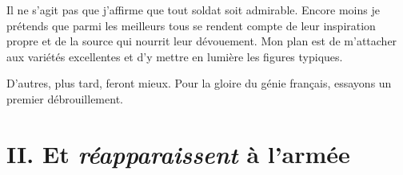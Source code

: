 \documentclass[french,twoside]{book} %
\newcommand\chapteropen{} %
\newcommand\chapterclose{} %
\begin{document}
Il ne s’agit pas que j’affirme que tout soldat soit admirable. Encore moins je prétends que parmi les meilleurs tous se rendent compte de leur inspiration propre et de la source qui nourrit leur dévouement. Mon plan est de m’attacher aux variétés excellentes et d’y mettre en lumière les figures typiques.‌\par
D’autres, plus tard, feront mieux. Pour la gloire du génie français, essayons un premier débrouillement.‌
\chapterclose


\chapteropen
\chapter[II. Et réapparaissent à l’armée]{II. Et {\itshape réapparaissent} à l’armée}\renewcommand{\leftmark}{II. Et {\itshape réapparaissent} à l’armée}
\end{document}
